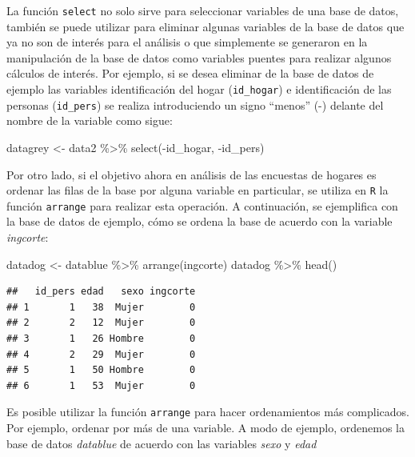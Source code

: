 \documentclass[
  12pt,
]{book}
\newenvironment{Shaded}{\begin{snugshade}}{\end{snugshade}}
\newcommand{\FunctionTok}[1]{\textcolor[rgb]{0.00,0.00,0.00}{#1}}
\newcommand{\NormalTok}[1]{#1}
\newcommand{\OtherTok}[1]{\textcolor[rgb]{0.56,0.35,0.01}{#1}}
\newcommand{\SpecialCharTok}[1]{\textcolor[rgb]{0.00,0.00,0.00}{#1}}
\begin{document}
La función \texttt{select} no solo sirve para seleccionar variables de una base de datos, también se puede utilizar para eliminar algunas variables de la base de datos que ya no son de interés para el análisis o que simplemente se generaron en la manipulación de la base de datos como variables puentes para realizar algunos cálculos de interés. Por ejemplo, si se desea eliminar de la base de datos de ejemplo las variables identificación del hogar (\texttt{id\_hogar}) e identificación de las personas (\texttt{id\_pers}) se realiza introduciendo un signo ``menos'' (-) delante del nombre de la variable como sigue:

\begin{Shaded}
\begin{Highlighting}[]
\NormalTok{datagrey }\OtherTok{\textless{}{-}}\NormalTok{ data2 }\SpecialCharTok{\%\textgreater{}\%} \FunctionTok{select}\NormalTok{(}\SpecialCharTok{{-}}\NormalTok{id\_hogar, }\SpecialCharTok{{-}}\NormalTok{id\_pers)}
\end{Highlighting}
\end{Shaded}

Por otro lado, si el objetivo ahora en análisis de las encuestas de hogares es ordenar las filas de la base por alguna variable en particular, se utiliza en \texttt{R} la función \texttt{arrange} para realizar esta operación. A continuación, se ejemplifica con la base de datos de ejemplo, cómo se ordena la base de acuerdo con la variable \emph{ingcorte}:

\begin{Shaded}
\begin{Highlighting}[]
\NormalTok{datadog }\OtherTok{\textless{}{-}}\NormalTok{ datablue }\SpecialCharTok{\%\textgreater{}\%} \FunctionTok{arrange}\NormalTok{(ingcorte)}
\NormalTok{datadog }\SpecialCharTok{\%\textgreater{}\%} \FunctionTok{head}\NormalTok{()}
\end{Highlighting}
\end{Shaded}

\begin{verbatim}
##   id_pers edad   sexo ingcorte
## 1       1   38  Mujer        0
## 2       2   12  Mujer        0
## 3       1   26 Hombre        0
## 4       2   29  Mujer        0
## 5       1   50 Hombre        0
## 6       1   53  Mujer        0
\end{verbatim}

Es posible utilizar la función \texttt{arrange} para hacer ordenamientos más complicados. Por ejemplo, ordenar por más de una variable. A modo de ejemplo, ordenemos la base de datos \emph{datablue} de acuerdo con las variables \emph{sexo} y \emph{edad}
\end{document}
